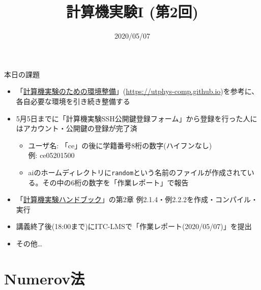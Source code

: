 \documentclass[10pt,dvipdfmx]{beamer}
\title{計算機実験I (第2回)}
\date{2020/05/07}
\begin{document}
\begin{frame}
  \titlepage
  \tableofcontents
\end{frame}

\begin{frame}[t]{本日の課題}
  \begin{itemize}
  \item 「\href{https://utphys-comp.github.io}{計算機実験のための環境整備}」({\small \href{https://utphys-comp.github.io}{https://utphys-comp.github.io}})を参考に、各自必要な環境を引き続き整備する
  \item 5月5日までに「計算機実験SSH公開鍵登録フォーム」から登録を行った人にはアカウント・公開鍵の登録が完了済
    \begin{itemize}
    \item ユーザ名: 「ce」の後に学籍番号8桁の数字(ハイフンなし) \\ 例: ce05201500
    \item aiのホームディレクトリに{\tt random}という名前のファイルが作成されている。その中の6桁の数字を「作業レポート」で報告
    \end{itemize}
  \item 「\href{https://github.com/utphys-comp/handbook/releases/download/handbook-2019/handbook.pdf}{計算機実験ハンドブック}」の第2章 例2.1.4・例2.2.2を作成・コンパイル・実行
  \item {\color{red} 講義終了後(18:00まで)にITC-LMSで「作業レポート(2020/05/07)」を提出}
  \item その他…
  \end{itemize}
\end{frame}








\section{Numerov法}









\end{document}
